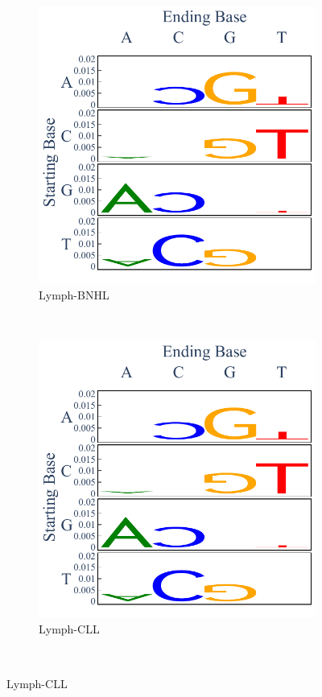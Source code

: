 \begin{figure}[h!]
    \begin{subfigure}{.5\textwidth}
    \centering
    \includegraphics[scale=0.45]{graphics/spectra_Lymph-BNHL.pdf}
    \caption{Lymph-BNHL}
    \end{subfigure}
    ~
    \begin{subfigure}{.5\textwidth}
    \centering
    \includegraphics[scale=0.5]{graphics/spectra_Lymph-CLL.pdf}
    \caption{Lymph-CLL}
    \end{subfigure} \\
    

\end{figure}
